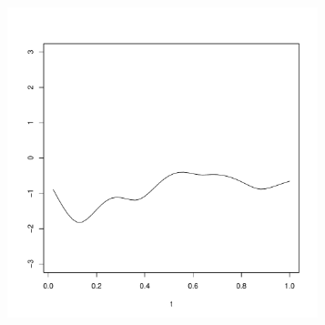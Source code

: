 \begin{figure}
\begin{subfigure}[b]{0.32\textwidth}
                \caption{}
                \label{}
        \end{subfigure}
         \begin{subfigure}[b]{0.32\textwidth}
                \centering
                \includegraphics[width=0.99\textwidth]{Images-future-work/ef2.pdf}
                \caption{}
                \label{}
        \end{subfigure}%
        

\end{figure}
